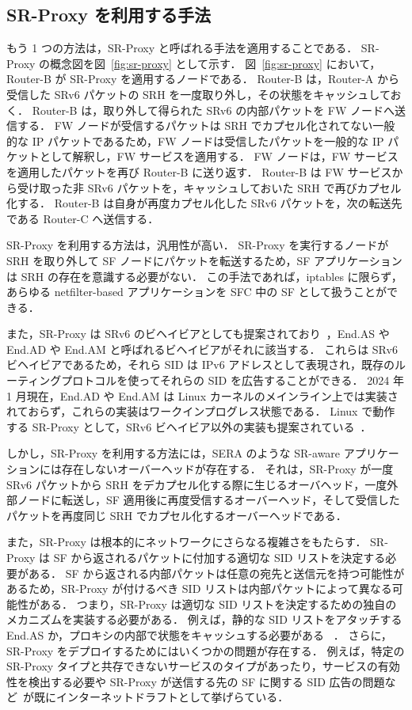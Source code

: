 \subsection{SR-Proxy を利用する手法}
\label{sbsection:use-sr-proxy}
もう 1 つの方法は，SR-Proxy と呼ばれる手法を適用することである．
SR-Proxy の概念図を図~\ref*{fig:sr-proxy} として示す．
図~\ref*{fig:sr-proxy} において，Router-B が SR-Proxy を適用するノードである．
Router-B は，Router-A から受信した SRv6 パケットの SRH を一度取り外し，その状態をキャッシュしておく．
Router-B は，取り外して得られた SRv6 の内部パケットを FW ノードへ送信する．
FW ノードが受信するパケットは SRH でカプセル化されてない一般的な IP パケットであるため，FW ノードは受信したパケットを一般的な IP パケットとして解釈し，FW サービスを適用する．
FW ノードは，FW サービスを適用したパケットを再び Router-B に送り返す．
Router-B は FW サービスから受け取った非 SRv6 パケットを，キャッシュしておいた SRH で再びカプセル化する．
Router-B は自身が再度カプセル化した SRv6 パケットを，次の転送先である Router-C へ送信する．

SR-Proxy を利用する方法は，汎用性が高い．
SR-Proxy を実行するノードが SRH を取り外して SF ノードにパケットを転送するため，SF アプリケーションは SRH の存在を意識する必要がない．
この手法であれば，iptables に限らず，あらゆる netfilter-based アプリケーションを SFC 中の SF として扱うことができる．

また，SR-Proxy は SRv6 のビヘイビアとしても提案されており~\cite{filsfils-spring-srv6-interop-02}，End.AS や End.AD や End.AM と呼ばれるビヘイビアがそれに該当する．
これらは SRv6 ビヘイビアであるため，それら SID は IPv6 アドレスとして表現され，既存のルーティングプロトコルを使ってそれらの SID を広告することができる．
2024 年 1 月現在，End.AD や End.AM は Linux カーネルのメインライン上では実装されておらず，これらの実装はワークインプログレス状態である．
Linux で動作する SR-Proxy として，SRv6 ビヘイビア以外の実装も提案されている~\cite{sfc-proxy-bpf,sfc-with-leg-vnf,afxdp-for-srv6}．

しかし，SR-Proxy を利用する方法には，SERA のような SR-aware アプリケーションには存在しないオーバーヘッドが存在する．
それは，SR-Proxy が一度 SRv6 パケットから SRH をデカプセル化する際に生じるオーバヘッド，一度外部ノードに転送し，SF 適用後に再度受信するオーバーヘッド，そして受信したパケットを再度同じ SRH でカプセル化するオーバーヘッドである．

また，SR-Proxy は根本的にネットワークにさらなる複雑さをもたらす．
SR-Proxy は SF から返されるパケットに付加する適切な SID リストを決定する必要がある．
SF から返される内部パケットは任意の宛先と送信元を持つ可能性があるため，SR-Proxy が付けるべき SID リストは内部パケットによって異なる可能性がある．
つまり，SR-Proxy は適切な SID リストを決定するための独自のメカニズムを実装する必要がある．
例えば，静的な SID リストをアタッチする End.AS か，プロキシの内部で状態をキャッシュする必要がある~\cite{sfc-proxy-bpf} ．
さらに，SR-Proxy をデプロイするためにはいくつかの問題が存在する．
例えば，特定の SR-Proxy タイプと共存できないサービスのタイプがあったり，サービスの有効性を検出する必要や SR-Proxy が送信する先の SF に関する SID 広告の問題など~\cite{draft-scexp}が既にインターネットドラフトとして挙げらている．

